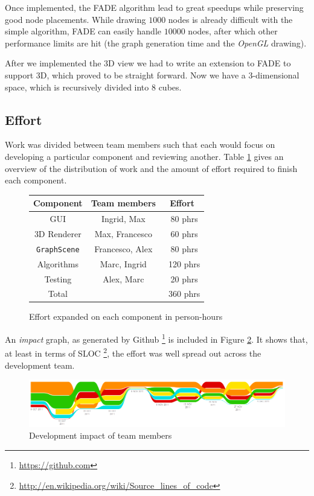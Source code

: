 \documentclass[a4paper,11pt,titlepage]{article}
\newcommand{\code}[1]{\texttt{#1}}
\newcommand{\buzz}[1]{\emph{#1}}
\newcommand{\OpenGL}{\buzz{OpenGL} }
\begin{document}
Once implemented, the FADE algorithm lead to great speedups while
preserving good node placements. While drawing \(1000\) nodes is
already difficult with the simple algorithm, FADE can easily handle
\(10000\) nodes, after which other performance limits are hit (the
graph generation time and the \OpenGL drawing).

After we implemented the 3D view we had to write an extension to FADE to support
3D, which proved to be straight forward. Now we have a 3-dimensional space,
which is recursively divided into $8$ cubes.

\subsection{Effort}

Work was divided between team members such that each would focus on
developing a particular component and reviewing another. Table
\ref{fig:effort} gives an overview of the distribution of work and the
amount of effort required to finish each component.

\begin{figure}[h]
  \centering
  \begin{tabular}{c|c|c}
    Component         & Team members    & Effort \\
    \hline
    GUI               & Ingrid, Max     & ~80 phrs \\
    3D Renderer       & Max, Francesco  & ~60 phrs\\
    \code{GraphScene} & Francesco, Alex & ~80 phrs\\
    Algorithms        & Marc, Ingrid    & ~120 phrs\\
    Testing           & Alex, Marc      & ~20 phrs\\
    \hline
    Total             &                 & ~360 phrs
  \end{tabular}
  \caption{Effort expanded on each component in person-hours}
  \label{fig:effort}
\end{figure}

An \emph{impact} graph, as generated by
Github \footnote{\url{https://github.com}} is included in Figure
\ref{fig:impact}. It shows that, at least in terms of
SLOC \footnote{\url{http://en.wikipedia.org/wiki/Source_lines_of_code}},
the effort was well spread out across the development team.

\begin{figure}[h]
  \centering
  \includegraphics[width=\textwidth]{impact.png}
  \caption{Development impact of team members}
  \label{fig:impact}
\end{figure}
\end{document}
